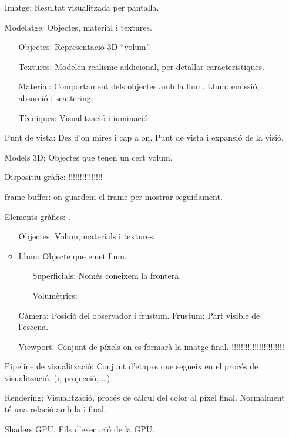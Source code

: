 \begin{itemize}
    \item[Imatge:] Resultat visualitzada per pantalla.
    \item[Modelatge:] Objectes, material i textures.
        \begin{itemize}
            \item[Objectes:] Representació 3D ``volum''.
            \item[Textures:] Modelen realisme addicional, per detallar característiques.
            \item[Material:] Comportament dels objectes amb la llum.
                \subitem Llum: emissió, absorció i scattering.
            \item[Tècniques:] Visualització i i\lgem{}uminació
        \end{itemize}
    \item[Punt de vista:] Des d'on mires i cap a on.
        \subitem[Càmera:] Punt de vista i expansió de la visió.
    \item[Models 3D:] Objectes que tenen un cert volum.
    \item[Dispositiu gràfic:] !!!!!!!!!!!!!!!
    \item[frame buffer:] on guardem el frame per mostrar seguidament.
    \item[Elements gràfics:] .
        \begin{itemize}
            \item[Objectes:] Volum, materials i textures.
                \item Llum: Objecte que emet llum.
                \begin{itemize}
                    \item[Superficials:] Només coneixem la frontera.
                    \item[Volumètrics:] 
                \end{itemize}
            \item[Càmera:] Posició del observador i frustum.
                \subitem Frustum: Part visible de l'escena.
            \item[Viewport:] Conjunt de píxels on es formarà la imatge final. !!!!!!!!!!!!!!!!!!!!!!!
        \end{itemize}
        
    \item[Pipeline de visualització:] Conjunt d'etapes que segueix en el procés de visualització.
        (i, projecció, \dots)
    \item[Rendering:] Visualització, procés de càlcul del color al píxel final.
        Normalment té una relació amb la i final.
        
    \item[Shaders] GPU. Fils d'execució de la GPU.
\end{itemize}

